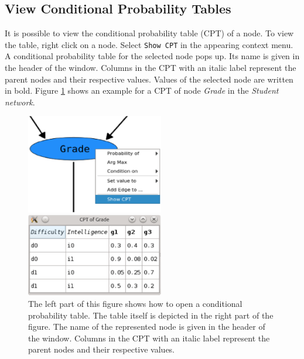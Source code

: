 \subsection{View Conditional Probability Tables}
It is possible to view the conditional probability table (CPT) of a node. To view the table, right click on a node. Select \texttt{Show CPT} in the appearing context menu.
A conditional probability table for the selected node pops up. Its name is given in the header of the window. Columns in the CPT with an italic label represent the parent nodes and their respective values. Values of the selected node are written in bold.
Figure \ref{figure:CPTs} shows an example for a CPT of node \textit{Grade} in the \textit{Student network}.
\begin{figure}[H]
  \begin{minipage}{6cm}
  \includegraphics[width=6cm]{pic/loadCPT.eps}
  \end{minipage}
  \begin{minipage}{6cm}
 \includegraphics[width=6cm]{pic/cpt.eps}
  \end{minipage}
  \caption{The left part of this figure shows how to open a conditional probability table. The table itself is depicted in the right part of the figure. The name of the represented node is given in the header of the window. Columns in the CPT with an italic label
  represent the parent nodes and their respective values.}
  \label{figure:CPTs}
\end{figure}



